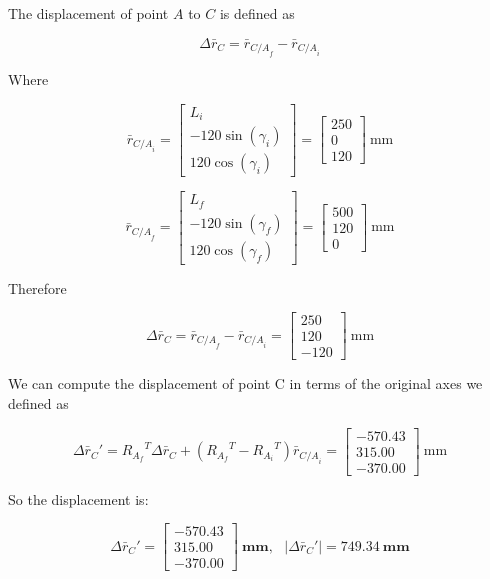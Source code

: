 \documentclass[12pt, letterpaper]{../assignment}
\begin{document}
The displacement of point $A$ to $C$ is defined as

$$ \Delta \bar{r}_C = \bar{r}_{{C/A}_f} - \bar{r}_{{C/A}_i}  $$

Where

$$ \bar{r}_{{C/A}_i} = \left[\begin{array}{r} L_i \\-120 \sin(\gamma_i) \\120 \cos(\gamma_i) \end{array}\right]
= \left[\begin{array}{c} 250\\ 0\\ 120 \end{array}\right] \ \text{mm} $$

$$ \bar{r}_{{C/A}_f} = \left[\begin{array}{r} L_f \\-120 \sin(\gamma_f) \\120 \cos(\gamma_f) \end{array}\right]
= \left[\begin{array}{c} 500\\ 120\\ 0 \end{array}\right] \ \text{mm} $$

Therefore

$$ \Delta \bar{r}_C = \bar{r}_{{C/A}_f} - \bar{r}_{{C/A}_i} 
= \left[\begin{array}{r} 250\\ 120\\ -120 \end{array}\right] \ \text{mm} $$

We can compute the displacement of point C in terms of the original axes we defined as

$$ \Delta {\bar{r}_C}' = {R_{A_f}}^T \Delta \bar{r}_C  + \left( {R_{A_f}}^T - {R_{A_i}}^T \right)\bar{r}_{{C/A}_i} = 
\left[\begin{array}{r}  -570.43\\315.00 \\ -370.00 \end{array}\right] \ \text{mm} $$

So the displacement is:

\begin{answer}
$$ \Delta {\bar{r}_C}' =
\left[\begin{array}{r}  -570.43\\315.00 \\ -370.00 \end{array}\right] \ \textbf{mm}, \ \ \
\left|\Delta {\bar{r}_C}'\right| = 749.34 \ \textbf{mm} $$
\end{answer}



\end{document}
